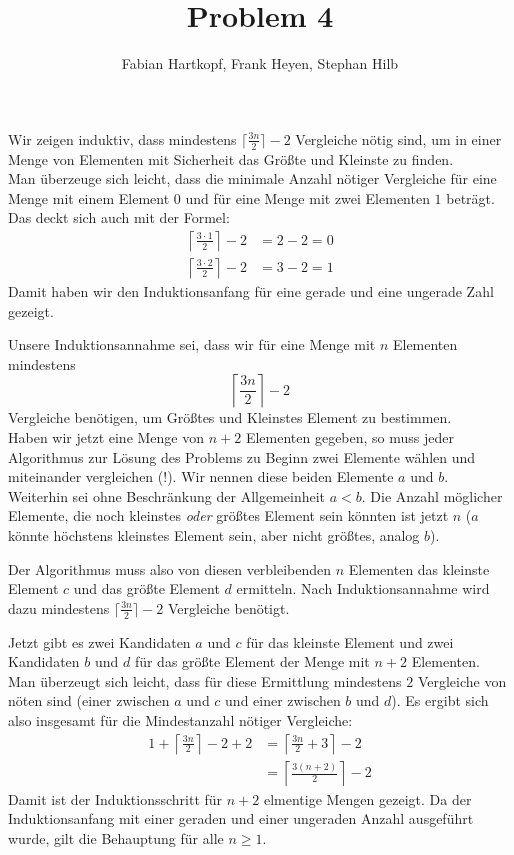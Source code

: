 \documentclass{scrartcl}
\author{Fabian Hartkopf, Frank Heyen, Stephan Hilb}
\title{Problem 4}
\begin{document}
\maketitle

Wir zeigen induktiv, dass mindestens $\lceil \frac {3n}2 \rceil - 2$ Vergleiche nötig sind, um in einer Menge von Elementen mit Sicherheit das Größte und Kleinste zu finden.
\\[1em]

Man überzeuge sich leicht, dass die minimale Anzahl nötiger Vergleiche für eine Menge mit einem Element $0$ und für eine Menge mit zwei Elementen $1$ beträgt.
Das deckt sich auch mit der Formel:
\begin{align*}	
	\left\lceil \frac {3\cdot1}2 \right\rceil - 2 &= 2 -2 = 0\\
   \left\lceil \frac{3\cdot 2}{2} \right\rceil -2 &= 3 - 2 = 1
\end{align*}
Damit haben wir den Induktionsanfang für eine gerade und eine ungerade Zahl gezeigt.

Unsere Induktionsannahme sei, dass wir für eine Menge mit $n$ Elementen mindestens
\[
	\left\lceil \frac {3n}2 \right\rceil -2
\]
Vergleiche benötigen, um Größtes und Kleinstes Element zu bestimmen.
\\[1em]

Haben wir jetzt eine Menge von $n+2$ Elementen gegeben, so muss jeder Algorithmus zur Lösung des Problems zu Beginn zwei Elemente wählen und miteinander vergleichen (!).
Wir nennen diese beiden Elemente $a$ und $b$. 
Weiterhin sei ohne Beschränkung der Allgemeinheit $a<b$.
Die Anzahl möglicher Elemente, die noch kleinstes \emph{oder} größtes Element sein könnten ist jetzt $n$ ($a$ könnte höchstens kleinstes Element sein, aber nicht größtes, analog $b$).

Der Algorithmus muss also von diesen verbleibenden $n$ Elementen das kleinste Element $c$ und das größte Element $d$ ermitteln.
Nach Induktionsannahme wird dazu mindestens $\lceil \frac {3n}2\rceil -2$ Vergleiche benötigt.

Jetzt gibt es zwei Kandidaten $a$ und $c$ für das kleinste Element und zwei Kandidaten $b$ und $d$ für das größte Element der Menge mit $n+2$ Elementen.
Man überzeugt sich leicht, dass für diese Ermittlung mindestens $2$ Vergleiche von nöten sind (einer zwischen $a$ und $c$ und einer zwischen $b$ und $d$).
Es ergibt sich also insgesamt für die Mindestanzahl nötiger Vergleiche:
\begin{align*}
	1 + \left\lceil \frac {3n}2 \right\rceil -2 + 2 &= \left\lceil \frac{3n}2 + 3\right\rceil -2\\
																																	 &= \left\lceil\frac{3(n+2)}2\right\rceil -2
\end{align*}
Damit ist der Induktionsschritt für $n+2$ elmentige Mengen gezeigt.
Da der Induktionsanfang mit einer geraden und einer ungeraden Anzahl ausgeführt wurde, gilt die Behauptung für alle $n\ge 1$.
\end{document}
